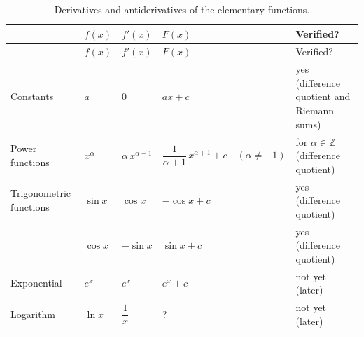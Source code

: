 \documentclass[
  letterpaper,
  DIV=11,
  numbers=noendperiod]{scrreprt}
\theoremstyle{plain}
\theoremstyle{plain}
\theoremstyle{definition}
\theoremstyle{definition}
\theoremstyle{definition}
\theoremstyle{plain}
\theoremstyle{plain}
\theoremstyle{remark}
\begin{document}
\begin{longtable}[]{@{}
  >{\raggedright\arraybackslash}p{}
  >{\centering\arraybackslash}p{}
  >{\centering\arraybackslash}p{}
  >{\centering\arraybackslash}p{}
  >{\raggedright\arraybackslash}p{}@{}}
\caption{Derivatives and antiderivatives of the elementary
functions.}\label{tbl-elementary-functions}\tabularnewline
\toprule\noalign{}
\begin{minipage}[b]{\linewidth}\raggedright
\end{minipage} & \begin{minipage}[b]{\linewidth}\centering
\(f(x)\)
\end{minipage} & \begin{minipage}[b]{\linewidth}\centering
\(f'(x)\)
\end{minipage} & \begin{minipage}[b]{\linewidth}\centering
\(F(x)\)
\end{minipage} & \begin{minipage}[b]{\linewidth}\raggedright
Verified?
\end{minipage} \\
\midrule\noalign{}
\endfirsthead
\toprule\noalign{}
\begin{minipage}[b]{\linewidth}\raggedright
\end{minipage} & \begin{minipage}[b]{\linewidth}\centering
\(f(x)\)
\end{minipage} & \begin{minipage}[b]{\linewidth}\centering
\(f'(x)\)
\end{minipage} & \begin{minipage}[b]{\linewidth}\centering
\(F(x)\)
\end{minipage} & \begin{minipage}[b]{\linewidth}\raggedright
Verified?
\end{minipage} \\
\midrule\noalign{}
\endhead
\bottomrule\noalign{}
\endlastfoot
Constants & \(a\) & \(0\) & \(ax+c\) & yes (difference quotient and
Riemann sums) \\
Power functions & \(x^\alpha\) & \(\alpha\, x^{\alpha-1}\) &
\(\dfrac{1}{\alpha+1}\,x^{\alpha+1}+c \quad (\alpha\neq-1)\) & for
\(\alpha\in\mathbb{Z}\) (difference quotient) \\
Trigonometric functions & \(\sin x\) & \(\cos x\) & \(-\cos x + c\) &
yes (difference quotient) \\
& \(\cos x\) & \(-\sin x\) & \(\sin x + c\) & yes (difference
quotient) \\
Exponential & \(e^x\) & \(e^x\) & \(e^x + c\) & not yet (later) \\
Logarithm & \(\ln x\) & \(\dfrac1x\) & ? & not yet (later) \\
\end{longtable}
\end{document}
